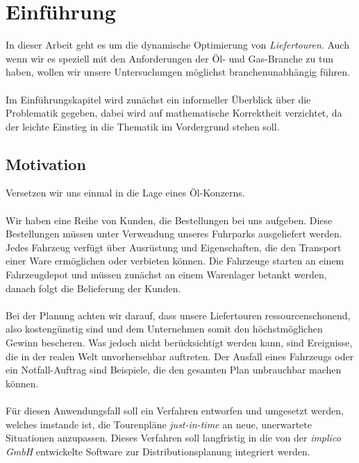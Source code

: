\chapter{Einführung}
In dieser Arbeit geht es um die dynamische Optimierung von \emph{Liefertouren}. Auch wenn wir es speziell mit den Anforderungen der Öl- und Gas-Branche zu tun haben, wollen wir unsere Untersuchungen möglichst branchenunabhängig führen. \\
\\
Im Einführungskapitel wird zunächst ein informeller Überblick über die Problematik gegeben, dabei wird auf mathematische Korrektheit verzichtet, da der leichte Einstieg in die Thematik im Vordergrund stehen soll.

\section{Motivation}
Versetzen wir uns einmal in die Lage eines Öl-Konzerns. \\
\\
Wir haben eine Reihe von Kunden, die Bestellungen bei uns aufgeben. Diese Bestellungen müssen unter Verwendung unseres Fuhrparks ausgeliefert werden. Jedes Fahrzeug verfügt über Ausrüstung und Eigenschaften, die den Transport einer Ware ermöglichen oder verbieten können. Die Fahrzeuge starten an einem Fahrzeugdepot und müssen zunächst an einem Warenlager betankt werden, danach folgt die Belieferung der Kunden. \\
\\
Bei der Planung achten wir darauf, dass unsere Liefertouren ressourcenschonend, also kostengünstig sind und dem Unternehmen somit den höchstmöglichen Gewinn bescheren. Was jedoch nicht berücksichtigt werden kann, sind Ereignisse, die in der realen Welt unvorhersehbar auftreten. Der Ausfall eines Fahrzeugs oder ein Notfall-Auftrag sind Beispiele, die den gesamten Plan unbrauchbar machen können. \\
\\
Für diesen Anwendungsfall soll ein Verfahren entworfen und umgesetzt werden, welches imstande ist, die Tourenpläne \emph{just-in-time} an neue, unerwartete Situationen anzupassen. Dieses Verfahren soll langfristig in die von der \emph{implico GmbH} entwickelte Software zur Distributionsplanung integriert werden.

\clearpage
